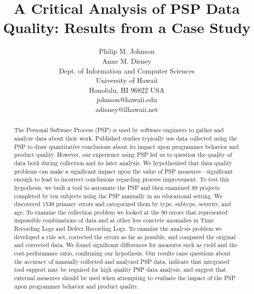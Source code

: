 




\title{A Critical Analysis of PSP Data Quality: Results from a Case Study}


\author{
        Philip M. Johnson\\
        Anne M. Disney\\
        Dept. of Information and Computer Sciences\\
        University of Hawaii\\
        Honolulu, HI  96822 USA\\
        johnson@hawaii.edu\\
        adisney@ilhawaii.net\\
       }

\maketitle

\begin{abstract}
  
  The Personal Software Process (PSP) is used by software engineers to
  gather and analyze data about their work.  Published studies typically
  use data collected using the PSP to draw quantitative conclusions about
  its impact upon programmer behavior and product quality.  However, our
  experience using PSP led us to question the quality of data both during
  collection and its later analysis.  We hypothesized that data quality
  problems can make a significant impact upon the value of PSP
  measures---significant enough to lead to incorrect conclusions regarding
  process improvement.  To test this hypothesis, we built a tool to
  automate the PSP and then examined 89 projects completed by ten subjects
  using the PSP manually in an educational setting.  We discovered 1539
  primary errors and categorized them by type, subtype, severity, and age.
  To examine the collection problem we looked at the 90 errors that
  represented impossible combinations of data and at other less concrete
  anomalies in Time Recording Logs and Defect Recording Logs.  To examine
  the analysis problem we developed a rule set, corrected the errors as far
  as possible, and compared the original and corrected data.  We found
  significant differences for measures such as yield and the
  cost-performance ratio, confirming our hypothesis.  Our results raise
  questions about the accuracy of manually collected and analyzed PSP data,
  indicate that integrated tool support may be required for high quality
  PSP data analysis, and suggest that external measures should be used when
  attempting to evaluate the impact of the PSP upon programmer behavior and
  product quality.

\end{abstract}

